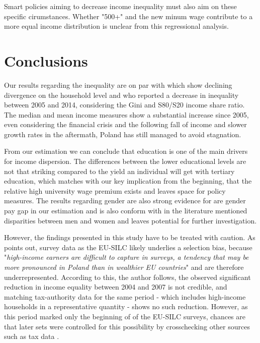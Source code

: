 \documentclass[a4paper]{article}\usepackage[]{graphicx}\usepackage[]{color}
\begin{document}
Smart policies aiming to decrease income inequality must also aim on these specific cirumstances. Whether "500+" and the new minum wage contribute to a more equal income distribution is unclear from this regressional analysis.  

\section{Conclusions}
\label{conclusion}
Our results regarding the inequality are on par with \cite{Gestwicki2016} which show declining divergence on the household level and \cite{Muszynska2018} who reported a decrease in inequality between 2005 and 2014, considering the Gini and S80/S20 income share ratio. 
The median and mean income measures show a substantial increase since 2005, even considering the financial crisis and the following fall of income and slower growth rates in the aftermath, Poland has still managed to avoid stagnation. 

From our estimation we can conclude that education is one of the main drivers for income dispersion. The differences between the lower educational levels are not that striking compared to the yield an individual will get with tertiary education, which matches with our key implication from the beginning, that the relative high university wage premium exists and leaves space for policy measures. The results regarding gender are also strong evidence for are gender pay gap in our estimation and is also conform with in the literature mentioned disparities between men and women and leaves potential for further investigation. 

However, the findings presented in this study have to be treated with caution. As \cite{brzezinski2017} points out, survey data as the EU-SILC likely underlies a selection bias, because "\textit{high-income earners are difficult to capture in surveys, a tendency that may be more pronounced in Poland than in wealthier EU countries}" and are therefore underrepresented. According to this, the author follows, the observed significant reduction in income equality between 2004 and 2007 is not credible, and matching tax-authority data for the same period - which includes high-income households in a representative quantity - shows no such reduction. However, as this period marked only the beginning of of the EU-SILC surveys, chances are that later sets were controlled for this possibility by crosschecking other sources such as tax data \parencite{brzezinski2017}.   
\end{document}
